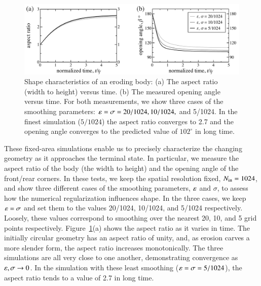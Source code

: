 \documentclass[preprint, 10pt]{elsarticle}
\begin{document}
\begin{figure}%
\begin{center}
\includegraphics[width = 0.85 \textwidth]{./figs/arangle.pdf}
\caption{Shape characteristics of an eroding body: (a) The aspect ratio (width to height) versus time. (b) The measured opening angle versus time. For both measurements, we show three cases of the smoothing parameters: $\varepsilon = \sigma = 20/1024, 10/1024,$ and 5/1024. In the finest simulation ($5/1024$) the aspect ratio converges to 2.7 and the opening angle converges to the predicted value of $102^{\circ}$ in long time.}
\label{fig:arangle}
\end{center}
\end{figure}

	These fixed-area simulations enable us to precisely characterize the changing geometry as it approaches the terminal state. In particular, we measure the aspect ratio of the body (the width to height) and the opening angle of the front/rear corners. In these tests, we keep the spatial resolution fixed, $N_{\mathrm{in}} = 1024$, and show three different cases of the smoothing parameters, $\varepsilon$ and $\sigma$, to assess how the numerical regularization influences shape. In the three cases, we keep $\varepsilon = \sigma$ and set them to the values 20/1024, 10/1024, and 5/1024 respectively. Loosely, these values correspond to smoothing over the nearest 20, 10, and 5 grid points respectively. Figure~\ref{fig:arangle}(a) shows the aspect ratio as it varies in time. The initially circular geometry has an aspect ratio of unity, and, as erosion carves a more slender form, the aspect ratio increases monotonically. The three simulations are all very close to one another, demonstrating convergence as $\varepsilon, \sigma \to 0$. In the simulation with these least smoothing ($\varepsilon = \sigma = 5/1024$), the aspect ratio tends to a value of 2.7 in long time.
\end{document}
